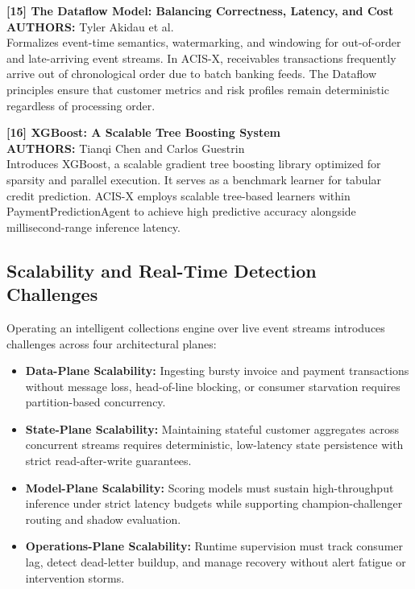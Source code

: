 \documentclass[a4paper, 12pt]{report}
\begin{document}
\noindent \textbf{[15] The Dataflow Model: Balancing Correctness, Latency, and Cost}\\
\textbf{AUTHORS:} Tyler Akidau et al.\\
Formalizes event-time semantics, watermarking, and windowing for out-of-order and late-arriving event streams. In ACIS-X, receivables transactions frequently arrive out of chronological order due to batch banking feeds. The Dataflow principles ensure that customer metrics and risk profiles remain deterministic regardless of processing order.

\noindent \textbf{[16] XGBoost: A Scalable Tree Boosting System}\\
\textbf{AUTHORS:} Tianqi Chen and Carlos Guestrin\\
Introduces XGBoost, a scalable gradient tree boosting library optimized for sparsity and parallel execution. It serves as a benchmark learner for tabular credit prediction. ACIS-X employs scalable tree-based learners within PaymentPredictionAgent to achieve high predictive accuracy alongside millisecond-range inference latency.

\subsection{Scalability and Real-Time Detection Challenges}
Operating an intelligent collections engine over live event streams introduces challenges across four architectural planes:
\begin{itemize}[itemsep=2pt]
    \item \textbf{Data-Plane Scalability:} Ingesting bursty invoice and payment transactions without message loss, head-of-line blocking, or consumer starvation requires partition-based concurrency.
    \item \textbf{State-Plane Scalability:} Maintaining stateful customer aggregates across concurrent streams requires deterministic, low-latency state persistence with strict read-after-write guarantees.
    \item \textbf{Model-Plane Scalability:} Scoring models must sustain high-throughput inference under strict latency budgets while supporting champion-challenger routing and shadow evaluation.
    \item \textbf{Operations-Plane Scalability:} Runtime supervision must track consumer lag, detect dead-letter buildup, and manage recovery without alert fatigue or intervention storms.
\end{itemize}
\end{document}
